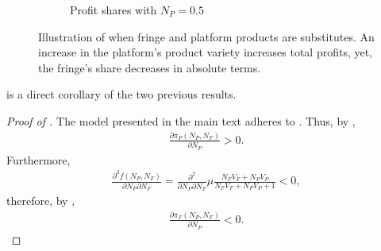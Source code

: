 \begin{figure}[ht]
\begin{subfigure}[b]{0.45\textwidth}
        \caption{Profit shares with $N_P = 0.5$}
    \end{subfigure}
    \caption{Illustration of  when fringe and platform products are substitutes. An increase in the platform's product variety increases total profits, yet, the fringe's share decreases in absolute terms.}
    \label{fig:increase_N_P_fringe}
\end{figure}

 is a direct corollary of the two previous results.
\begin{proof}[Proof of ]
    The model presented in the main text adheres to . Thus, by ,
    \begin{align*}
        \frac{\partial \pi_P(N_P, N_F)}{\partial N_P} > 0.
    \end{align*}
    Furthermore,
    \begin{align*}
        \frac{\partial^2 f(N_P, N_F)}{\partial N_P \partial N_F} = \frac{\partial^2}{\partial N_P \partial N_F} \mu \frac{N_F V_F + N_P V_P}{N_F V_F + N_P V_P + 1} < 0,
    \end{align*}
    therefore, by ,
    \begin{align*}
        \frac{\partial \pi_F(N_P, N_F)}{\partial N_P} < 0.
    \end{align*}    
\end{proof}



